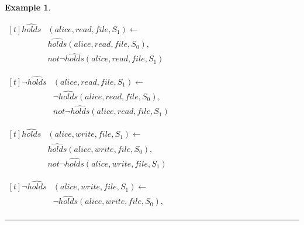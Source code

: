 \documentclass[10pt, twocolumn]{article}
\newtheorem{examp}{Example}
\newenvironment{example}{\begin{examp}\rm}{\rule{2mm}{2mm}\end{examp}}
\begin{document}
\begin{example}

          \begin{list}{}{Inertial Rules}
            \item
              \begin{math}
                  \begin{aligned}[t]
                    \hat{holds}&(alice, read, file, S_{1}) \leftarrow \\
                    & \hat{holds}(alice, read, file, S_{0}), \\
                    & not \lnot \hat{holds}(alice, read, file, S_{1})
                  \end{aligned}
              \end{math}
            \item
              \begin{math}
                  \begin{aligned}[t]
                    \lnot \hat{holds}&(alice, read, file, S_{1}) \leftarrow \\
                    & \lnot \hat{holds}(alice, read, file, S_{0}), \\
                    & not \lnot \hat{holds}(alice, read, file, S_{1})
                  \end{aligned}
              \end{math}
            \item
              \begin{math}
                  \begin{aligned}[t]
                    \hat{holds}&(alice, write, file, S_{1}) \leftarrow \\
                    & \hat{holds}(alice, write, file, S_{0}), \\
                    & not \lnot \hat{holds}(alice, write, file, S_{1})
                  \end{aligned}
              \end{math}
            \item
              \begin{math}
                  \begin{aligned}[t]
                    \lnot \hat{holds}&(alice, write, file, S_{1}) \leftarrow \\
                    & \lnot \hat{holds}(alice, write, file, S_{0}), \\

\end{aligned}
\end{math}
\end{list}
\end{example}
\end{document}

